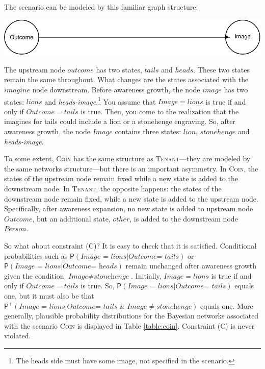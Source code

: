 \documentclass[
  11pt,
  dvipsnames,enabledeprecatedfontcommands, todos]{scrartcl}
\newcommand{\pr}[1]{\ensuremath{\mathsf{P}(#1)}}
\newcommand{\ppr}[2]{\ensuremath{\mathsf{P}^{#1}(#2)}}
\begin{document}
The scenario can be modeled by this familiar graph structure:

\begin{center}\includegraphics[width=0.5\linewidth,height=0.3\textheight]{ReplyToSteeleStefansson5_files/figure-latex/tailsDAG-1} \end{center}

\noindent The upstream node \(outcome\) has two states, \(tails\) and
\(heads\). These two states remain the same throughout. What changes are
the states associated with the \(imagine\) node downstream. Before
awareness growth, the node \(image\) has two states: \(lions\) and
\textit{heads-image}.\footnote{The heads side must have some image, not
  specified in the scenario.} You assume that \(Image=lions\) is true if
and only if \(Outcome=tails\) is true. Then, you come to the realization
that the imagines for tails could include a lion or a stonehenge
engraving. So, after awareness growth, the node \(Image\) contains three
states: \(lion\), \(stonehenge\) and \textit{heads-image}.

To some extent, \textsc{Coin} has the same structure as
\textsc{Tenant}---they are modeled by the same networks structure---but
there is an important asymmetry. In \textsc{Coin}, the states of the
upstream node remain fixed while a new state is added to the downstream
node. In \textsc{Tenant}, the opposite happens: the states of the
downstream node remain fixed, while a new state is added to the upstream
node. Specifically, after awareness expansion, no new state is added to
upstream node \(Outcome\), but an additional state, \(other\), is added
to the downstream node \(Person\).

So what about constraint (C)? It is easy to check that it is satisfied.
Conditional probabilities such as
\(\pr{\textit{Image = lions} \vert \textit{Outcome= tails}}\) or
\(\pr{\textit{Image = lions} \vert \textit{Outcome= heads}}\) remain
unchanged after awareness growth given the condition
\(\textit{Image} \neq \textit{stonehenge}\). Initially, \(Image=lions\)
is true if and only if \(Outcome=tails\) is true. So,
\(\pr{\textit{Image = lions} \vert \textit{Outcome= tails}}\) equals
one, but it must also be that
\(\ppr{+}{\textit{Image = lions} \vert \textit{Outcome= tails} \; \& \; \textit{Image} \neq \textit{stonehenge}}\)
equals one. More generally, plausible probability distributions for the
Bayesian networks associated with the scenario \textsc{Coin} is
displayed in Table \ref{table:coin}. Constraint (C) is never violated.
\end{document}
